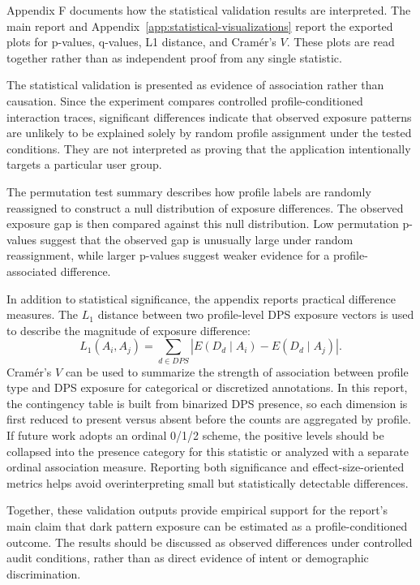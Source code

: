 Appendix F documents how the statistical validation results are interpreted. The main report and Appendix~\ref{app:statistical-visualizations} report the exported plots for p-values, q-values, L1 distance, and Cramér's \(V\). These plots are read together rather than as independent proof from any single statistic.

The statistical validation is presented as evidence of association rather than causation. Since the experiment compares controlled profile-conditioned interaction traces, significant differences indicate that observed exposure patterns are unlikely to be explained solely by random profile assignment under the tested conditions. They are not interpreted as proving that the application intentionally targets a particular user group.

The permutation test summary describes how profile labels are randomly reassigned to construct a null distribution of exposure differences. The observed exposure gap is then compared against this null distribution. Low permutation p-values suggest that the observed gap is unusually large under random reassignment, while larger p-values suggest weaker evidence for a profile-associated difference.

In addition to statistical significance, the appendix reports practical difference measures. The \(L_1\) distance between two profile-level DPS exposure vectors is used to describe the magnitude of exposure difference:
\[
L_1(A_i, A_j) = \sum_{d \in DPS} 
\left| E(D_d \mid A_i) - E(D_d \mid A_j) \right|.
\]
Cramér's \(V\) can be used to summarize the strength of association between profile type and DPS exposure for categorical or discretized annotations. In this report, the contingency table is built from binarized DPS presence, so each dimension is first reduced to present versus absent before the counts are aggregated by profile. If future work adopts an ordinal 0/1/2 scheme, the positive levels should be collapsed into the presence category for this statistic or analyzed with a separate ordinal association measure. Reporting both significance and effect-size-oriented metrics helps avoid overinterpreting small but statistically detectable differences.

Together, these validation outputs provide empirical support for the report's main claim that dark pattern exposure can be estimated as a profile-conditioned outcome. The results should be discussed as observed differences under controlled audit conditions, rather than as direct evidence of intent or demographic discrimination.
